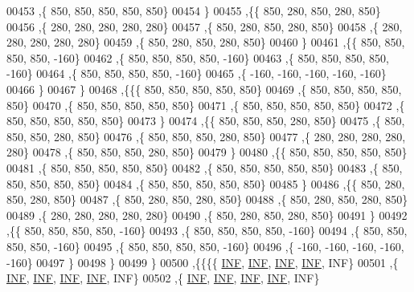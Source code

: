 \begin{DoxyCode}
00453    ,\{   850,   850,   850,   850,   850\}
00454    \}
00455   ,\{\{   850,   280,   850,   280,   850\}
00456    ,\{   280,   280,   280,   280,   280\}
00457    ,\{   850,   280,   850,   280,   850\}
00458    ,\{   280,   280,   280,   280,   280\}
00459    ,\{   850,   280,   850,   280,   850\}
00460    \}
00461   ,\{\{   850,   850,   850,   850,  -160\}
00462    ,\{   850,   850,   850,   850,  -160\}
00463    ,\{   850,   850,   850,   850,  -160\}
00464    ,\{   850,   850,   850,   850,  -160\}
00465    ,\{  -160,  -160,  -160,  -160,  -160\}
00466    \}
00467   \}
00468  ,\{\{\{   850,   850,   850,   850,   850\}
00469    ,\{   850,   850,   850,   850,   850\}
00470    ,\{   850,   850,   850,   850,   850\}
00471    ,\{   850,   850,   850,   850,   850\}
00472    ,\{   850,   850,   850,   850,   850\}
00473    \}
00474   ,\{\{   850,   850,   850,   280,   850\}
00475    ,\{   850,   850,   850,   280,   850\}
00476    ,\{   850,   850,   850,   280,   850\}
00477    ,\{   280,   280,   280,   280,   280\}
00478    ,\{   850,   850,   850,   280,   850\}
00479    \}
00480   ,\{\{   850,   850,   850,   850,   850\}
00481    ,\{   850,   850,   850,   850,   850\}
00482    ,\{   850,   850,   850,   850,   850\}
00483    ,\{   850,   850,   850,   850,   850\}
00484    ,\{   850,   850,   850,   850,   850\}
00485    \}
00486   ,\{\{   850,   280,   850,   280,   850\}
00487    ,\{   850,   280,   850,   280,   850\}
00488    ,\{   850,   280,   850,   280,   850\}
00489    ,\{   280,   280,   280,   280,   280\}
00490    ,\{   850,   280,   850,   280,   850\}
00491    \}
00492   ,\{\{   850,   850,   850,   850,  -160\}
00493    ,\{   850,   850,   850,   850,  -160\}
00494    ,\{   850,   850,   850,   850,  -160\}
00495    ,\{   850,   850,   850,   850,  -160\}
00496    ,\{  -160,  -160,  -160,  -160,  -160\}
00497    \}
00498   \}
00499  \}
00500 ,\{\{\{\{   \hyperlink{constants_8h_a12c2040f25d8e3a7b9e1c2024c618cb6}{INF},   \hyperlink{constants_8h_a12c2040f25d8e3a7b9e1c2024c618cb6}{INF},   \hyperlink{constants_8h_a12c2040f25d8e3a7b9e1c2024c618cb6}{INF},   \hyperlink{constants_8h_a12c2040f25d8e3a7b9e1c2024c618cb6}{INF},   INF\}
00501    ,\{   \hyperlink{constants_8h_a12c2040f25d8e3a7b9e1c2024c618cb6}{INF},   \hyperlink{constants_8h_a12c2040f25d8e3a7b9e1c2024c618cb6}{INF},   \hyperlink{constants_8h_a12c2040f25d8e3a7b9e1c2024c618cb6}{INF},   \hyperlink{constants_8h_a12c2040f25d8e3a7b9e1c2024c618cb6}{INF},   INF\}
00502    ,\{   \hyperlink{constants_8h_a12c2040f25d8e3a7b9e1c2024c618cb6}{INF},   \hyperlink{constants_8h_a12c2040f25d8e3a7b9e1c2024c618cb6}{INF},   \hyperlink{constants_8h_a12c2040f25d8e3a7b9e1c2024c618cb6}{INF},   \hyperlink{constants_8h_a12c2040f25d8e3a7b9e1c2024c618cb6}{INF},   INF\}

\end{DoxyCode}
